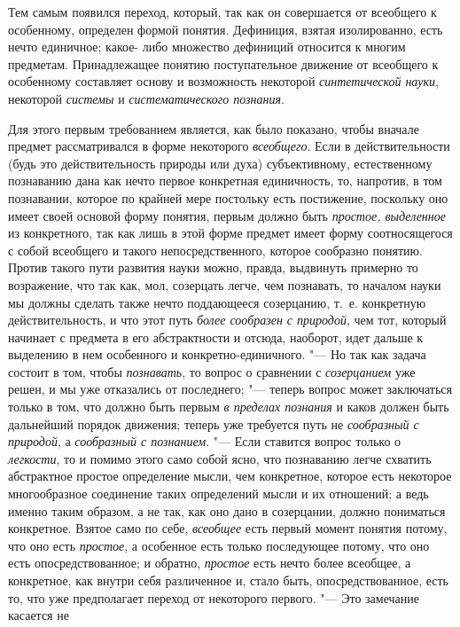 {{Тем самым появился переход, который, так как он совершается от
всеобщего к особенному, определен формой понятия. Дефиниция, взятая
изолированно, есть нечто единичное; какое- либо множество дефиниций
относится к многим предметам. Принадлежащее понятию поступательное движение
от всеобщего к особенному составляет основу и возможность некоторой
{\em синтетической науки},
некоторой {\em системы}
и {\em систематического
познания}.

Для этого первым требованием является, как было показано,
чтобы вначале предмет рассматривался в форме некоторого
{\em всеобщего}. Если в
действительности (будь это действительность природы или духа)
субъективному, естественному познаванию дана как нечто первое конкретная
единичность, то, напротив, в том познавании, которое по крайней мере
постольку есть постижение, поскольку оно имеет своей основой форму понятия,
первым должно быть {\em простое,
выделенное} из конкретного, так как лишь в этой форме
предмет имеет форму соотносящегося с собой всеобщего и такого
непосредственного, которое сообразно понятию. Против такого пути развития
науки можно, правда, выдвинуть примерно то возражение, что так как, мол,
созерцать легче, чем познавать, то началом науки мы должны
сделать также нечто поддающееся созерцанию, т.~е. конкретную
действительность, и что этот путь
{\em более сообразен с природой},
чем тот, который начинает с предмета в его абстрактности и
отсюда, наоборот, идет дальше к выделению в нем особенного и
конкретно-единичного. "--- Но так как задача состоит в том,
чтобы {\em познавать}, то
вопрос о сравнении с {\em созерцанием}
уже решен, и мы уже отказались от последнего;
"--- теперь вопрос может заключаться только в том, что должно
быть первым {\em в пределах познания}
и каков должен быть дальнейший порядок движения; теперь уже
требуется путь не {\em сообразный с
природой}, а{\em
сообразный с познанием}. "--- Если ставится
вопрос только о {\em легкости},
то и помимо этого само собой ясно, что познаванию легче
схватить абстрактное простое определение мысли, чем конкретное, которое
есть некоторое многообразное соединение таких определений мысли и их
отношений; а ведь именно таким образом, а не так, как оно дано в
созерцании, должно пониматься конкретное. Взятое само по себе,
{\em всеобщее} есть
первый момент понятия потому, что оно есть
{\em простое}, а
особенное есть только последующее потому, что оно есть опосредствованное; и
обратно, {\em простое}
есть нечто более всеобщее, а конкретное, как внутри себя
различенное и, стало быть, опосредствованное, есть то, что уже предполагает
переход от некоторого первого. "--- Это замечание касается не
}}
